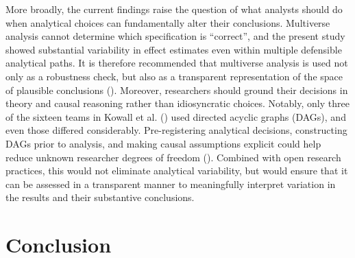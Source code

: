 \documentclass[
  man,
  floatsintext,
  longtable,
  nolmodern,
  notxfonts,
  notimes,
  colorlinks=true,linkcolor=blue,citecolor=blue,urlcolor=blue]{apa7}
\begin{document}
More broadly, the current findings raise the question of what analysts
should do when analytical choices can fundamentally alter their
conclusions. Multiverse analysis cannot determine which specification is
``correct'', and the present study showed substantial variability in
effect estimates even within multiple defensible analytical paths. It is
therefore recommended that multiverse analysis is used not only as a
robustness check, but also as a transparent representation of the space
of plausible conclusions
(). Moreover, researchers should ground their decisions in theory
and causal reasoning rather than idiosyncratic choices. Notably, only
three of the sixteen teams in Kowall et al.
() used directed acyclic graphs
(DAGs), and even those differed considerably. Pre-registering analytical
decisions, constructing DAGs prior to analysis, and making causal
assumptions explicit could help reduce unknown researcher degrees of
freedom (). Combined with open research practices, this would not
eliminate analytical variability, but would ensure that it can be
assessed in a transparent manner to meaningfully interpret variation in
the results and their substantive conclusions.

\section{Conclusion}\label{conclusion}
\end{document}
